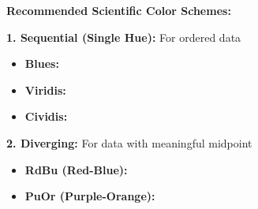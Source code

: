 \documentclass[11pt,a4paper]{article}
\begin{document}
\begin{tcolorbox}[colback=blue!5,colframe=blue!50,title={Professional Color Palettes}]
\textbf{Recommended Scientific Color Schemes:}

\textbf{1. Sequential (Single Hue):} For ordered data

\begin{itemize}
    \item \textbf{Blues:} 
    \colorbox[HTML]{f7fbff}{\phantom{XX}}
    \colorbox[HTML]{deebf7}{\phantom{XX}}
    \colorbox[HTML]{c6dbef}{\phantom{XX}}
    \colorbox[HTML]{9ecae1}{\phantom{XX}}
    \colorbox[HTML]{6baed6}{\phantom{XX}}
    \colorbox[HTML]{4292c6}{\phantom{XX}}
    \colorbox[HTML]{2171b5}{\phantom{XX}}
    \colorbox[HTML]{08519c}{\phantom{XX}}
    \colorbox[HTML]{08306b}{\phantom{XX}}
    
    \item \textbf{Viridis:} 
    \colorbox[HTML]{440154}{\phantom{XX}}
    \colorbox[HTML]{482777}{\phantom{XX}}
    \colorbox[HTML]{3f4a8a}{\phantom{XX}}
    \colorbox[HTML]{31678e}{\phantom{XX}}
    \colorbox[HTML]{26838f}{\phantom{XX}}
    \colorbox[HTML]{1f9d8a}{\phantom{XX}}
    \colorbox[HTML]{6cce5a}{\phantom{XX}}
    \colorbox[HTML]{b6de2b}{\phantom{XX}}
    \colorbox[HTML]{fde725}{\phantom{XX}}
    
    \item \textbf{Cividis:} 
    \colorbox[HTML]{00204d}{\phantom{XX}}
    \colorbox[HTML]{00336f}{\phantom{XX}}
    \colorbox[HTML]{39486a}{\phantom{XX}}
    \colorbox[HTML]{575c6d}{\phantom{XX}}
    \colorbox[HTML]{707173}{\phantom{XX}}
    \colorbox[HTML]{8a8779}{\phantom{XX}}
    \colorbox[HTML]{a69d75}{\phantom{XX}}
    \colorbox[HTML]{c4b56c}{\phantom{XX}}
    \colorbox[HTML]{e4cf5b}{\phantom{XX}}
    \colorbox[HTML]{ffe945}{\phantom{XX}}
\end{itemize}

\textbf{2. Diverging:} For data with meaningful midpoint

\begin{itemize}
    \item \textbf{RdBu (Red-Blue):} 
    \colorbox[HTML]{b2182b}{\phantom{XX}}
    \colorbox[HTML]{d6604d}{\phantom{XX}}
    \colorbox[HTML]{f4a582}{\phantom{XX}}
    \colorbox[HTML]{fddbc7}{\phantom{XX}}
    \colorbox[HTML]{f7f7f7}{\phantom{XX}}
    \colorbox[HTML]{d1e5f0}{\phantom{XX}}
    \colorbox[HTML]{92c5de}{\phantom{XX}}
    \colorbox[HTML]{4393c3}{\phantom{XX}}
    \colorbox[HTML]{2166ac}{\phantom{XX}}
    
    \item \textbf{PuOr (Purple-Orange):} 
    \colorbox[HTML]{762a83}{\phantom{XX}}
    \colorbox[HTML]{9970ab}{\phantom{XX}}
    \colorbox[HTML]{c2a5cf}{\phantom{XX}}
    \colorbox[HTML]{e7d4e8}{\phantom{XX}}
    \colorbox[HTML]{f7f7f7}{\phantom{XX}}
    \colorbox[HTML]{fdb863}{\phantom{XX}}
    \colorbox[HTML]{e08214}{\phantom{XX}}
    \colorbox[HTML]{b35806}{\phantom{XX}}
    \colorbox[HTML]{7f3b08}{\phantom{XX}}
    

\end{itemize}
\end{tcolorbox}
\end{document}
